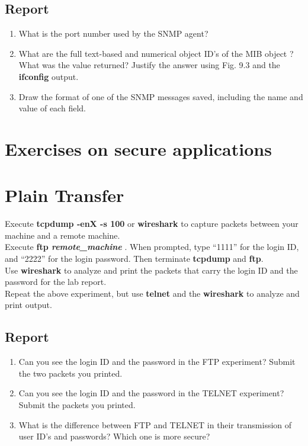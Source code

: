 \documentclass{../UTNetLab}
\begin{document}
	\subsection*{Report}
	\begin{enumerate}
		\item What is the port number used by the SNMP agent?
		\item What are the full text-based and numerical object ID’s of the MIB object ? What was the value returned? Justify the answer using Fig. 9.3 and the \textbf{ifconfig} output.
		\item Draw the format of one of the SNMP messages saved, including the name and value of each field.
	\end{enumerate}

\section*{Exercises on secure applications}
	
\section{Plain Transfer}
	Execute \textbf{tcpdump -enX -s 100} or \textbf{wireshark} to capture packets between your machine and a remote machine.\\
	Execute \textbf{ftp \textit{remote\_machine}} . When prompted, type “1111” for the login ID, and “2222” for the login password. Then terminate \textbf{tcpdump} and \textbf{ftp}.\\
	Use \textbf{wireshark} to analyze and print the packets that carry the login ID and the password for the lab report.\\
	Repeat the above experiment, but use \textbf{telnet} and the \textbf{wireshark} to analyze and print output.

	\subsection*{Report}
	\begin{enumerate}
		\item Can you see the login ID and the password in the FTP experiment? Submit the two packets you printed.
		\item Can you see the login ID and the password in the TELNET experiment? Submit the packets you printed.
		\item What is the difference between FTP and TELNET in their transmission of user ID’s and passwords? Which one is more secure?
	\end{enumerate}
\end{document}
